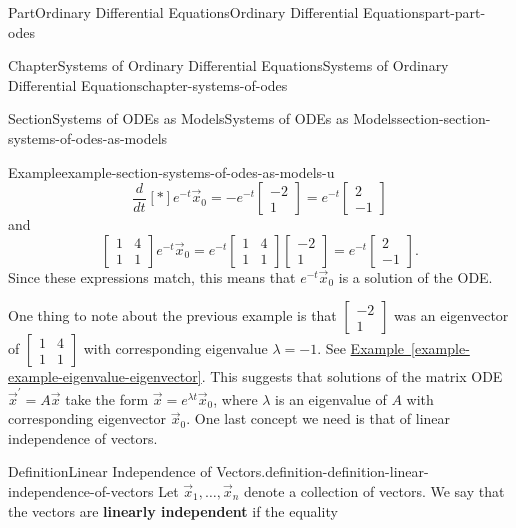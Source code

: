 \documentclass[twoside,10pt,]{book}
\newcommand{\xreffont}{\relax}
\newcommand{\terminology}[1]{\textbf{#1}}
\numberwithin{equation}{part}
\newcommand{\dv}[3][]{\dfrac{d^{#1} #2}{d #3^{#1}}}
\newcommand{\brackets}[1]{\left[ #1 \right]}
\begin{document}
\begin{partptx}{Part}{Ordinary Differential Equations}{}{Ordinary Differential Equations}{}{}{part-part-odes}
\begin{chapterptx}{Chapter}{Systems of Ordinary Differential Equations}{}{Systems of Ordinary Differential Equations}{}{}{chapter-systems-of-odes}
\begin{sectionptx}{Section}{Systems of ODEs as Models}{}{Systems of ODEs as Models}{}{}{section-section-systems-of-odes-as-models}
\begin{example}{Example}{}{example-section-systems-of-odes-as-models-u}
\begin{equation*}
\dv{}{t}\brackets*{e^{-t}\vec{x}_{0}} = -e^{-t}\begin{bmatrix}-2\\1\end{bmatrix} = e^{-t}\begin{bmatrix}2\\-1\end{bmatrix}
\end{equation*}
and%
\begin{equation*}
\begin{bmatrix}1& 4\\1& 1\end{bmatrix}e^{-t}\vec{x}_{0} = e^{-t}\begin{bmatrix}1& 4\\1& 1\end{bmatrix}\begin{bmatrix}-2\\1\end{bmatrix} = e^{-t}\begin{bmatrix}2\\-1\end{bmatrix}.
\end{equation*}
Since these expressions match, this means that \(e^{-t}\vec{x}_{0}\) is a solution of the ODE.%
\end{example}
One thing to note about the previous example is that \(\begin{bmatrix}-2\\1\end{bmatrix}\) was an eigenvector of \(\begin{bmatrix}1& 4\\1& 1\end{bmatrix}\) with corresponding eigenvalue \(\lambda=-1\). See \hyperref[example-example-eigenvalue-eigenvector]{Example~{\xreffont\ref{example-example-eigenvalue-eigenvector}}}. This suggests that solutions of the matrix ODE \(\vec{x}^\prime = A\vec{x}\) take the form \(\vec{x} = e^{\lambda t}\vec{x}_{0}\), where \(\lambda\) is an eigenvalue of \(A\) with corresponding eigenvector \(\vec{x}_{0}\). One last concept we need is that of linear independence of vectors.%
\begin{definition}{Definition}{Linear Independence of Vectors.}{definition-definition-linear-independence-of-vectors}%
%
Let \(\vec{x}_{1},\dots,\vec{x}_{n}\) denote a collection of vectors. We say that the vectors are \terminology{linearly independent} if the equality%
\begin{equation*}

\end{equation*}
\end{definition}
\end{sectionptx}
\end{chapterptx}
\end{partptx}
\end{document}
